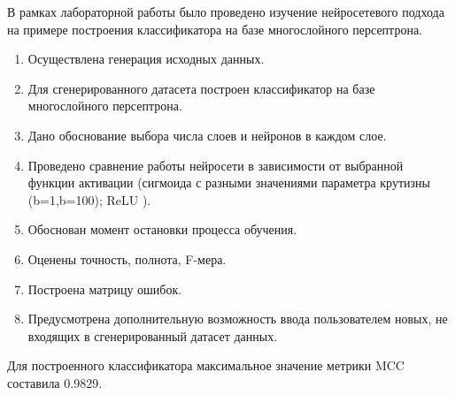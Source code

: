 
В рамках лабораторной работы было проведено изучение нейросетевого подхода на примере построения классификатора на базе многослойного персептрона.

\begin{enumerate}[label*=\arabic*.]
	\item Осуществлена генерация исходных данных.
	\item Для сгенерированного датасета построен классификатор на базе многослойного персептрона.
	\item Дано обоснование выбора числа слоев и нейронов в каждом слое.
	\item Проведено сравнение работы нейросети в зависимости от выбранной функции активации (сигмоида с разными значениями параметра крутизны (b=1,b=100);  ReLU ).
	\item Обоснован момент остановки процесса обучения.
	\item Оценены точность, полнота, F-мера.
	\item Построена матрицу ошибок.
	\item Предусмотрена дополнительную возможность ввода пользователем новых, не входящих в сгенерированный датасет данных.
\end{enumerate}

Для построенного классификатора максимальное значение метрики MCC составила 0.9829.
